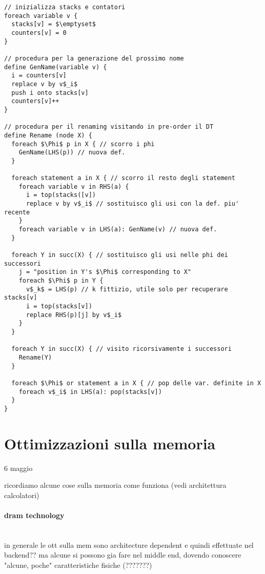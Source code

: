 \begin{lstlisting}[morekeywords={foreach,statement,node,variable,in,remove,from,insert,defined,replace,define,push,onto,by}]
// inizializza stacks e contatori
foreach variable v {
  stacks[v] = $\emptyset$
  counters[v] = 0
}

// procedura per la generazione del prossimo nome
define GenName(variable v) {
  i = counters[v]
  replace v by v$_i$
  push i onto stacks[v]
  counters[v]++
}

// procedura per il renaming visitando in pre-order il DT
define Rename (node X) {
  foreach $\Phi$ p in X { // scorro i phi
    GenName(LHS(p)) // nuova def.
  } 

  foreach statement a in X { // scorro il resto degli statement
    foreach variable v in RHS(a) {
      i = top(stacks([v])
      replace v by v$_i$ // sostituisco gli usi con la def. piu' recente
    }
    foreach variable v in LHS(a): GenName(v) // nuova def.
  }

  foreach Y in succ(X) { // sostituisco gli usi nelle phi dei successori
    j = "position in Y's $\Phi$ corresponding to X"
    foreach $\Phi$ p in Y { 
      v$_k$ = LHS(p) // k fittizio, utile solo per recuperare stacks[v]
      i = top(stacks[v])
      replace RHS(p)[j] by v$_i$
    }
  }

  foreach Y in succ(X) { // visito ricorsivamente i successori
    Rename(Y)
  }

  foreach $\Phi$ or statement a in X { // pop delle var. definite in X
    foreach v$_i$ in LHS(a): pop(stacks[v])
  }
}\end{lstlisting}

\section{Ottimizzazioni sulla memoria}

6 maggio

ricordiamo alcune cose sulla memoria come funziona (vedi architettura calcolatori)

\paragraph{dram technology}~\\

in generale le ott sulla mem sono architecture dependent e quindi effettuate nel backend?? ma alcune si possono gia fare nel middle end, dovendo conoscere "alcune, poche" caratteristiche fisiche (???????)

